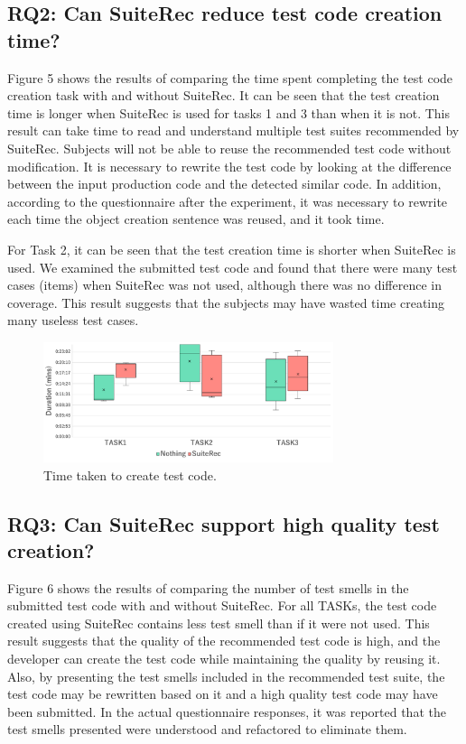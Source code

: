 \documentclass[conference]{IEEEtran}
\begin{document}
\subsection{RQ2: Can SuiteRec reduce test code creation time?}
Figure 5 shows the results of comparing the time spent completing the test code creation task with and without SuiteRec. It can be seen that the test creation time is longer when SuiteRec is used for tasks 1 and 3 than when it is not. This result can take time to read and understand multiple test suites recommended by SuiteRec. Subjects will not be able to reuse the recommended test code without modification. It is necessary to rewrite the test code by looking at the difference between the input production code and the detected similar code. In addition, according to the questionnaire after the experiment, it was necessary to rewrite each time the object creation sentence was reused, and it took time.

For Task 2, it can be seen that the test creation time is shorter when SuiteRec is used. We examined the submitted test code and found that there were many test cases (items) when SuiteRec was not used, although there was no difference in coverage. This result suggests that the subjects may have wasted time creating many useless test cases.

\begin{figure}[htbp]
\centerline{\includegraphics[width=8.5cm]{duration.pdf}}
\caption{Time taken to create test code.}
\label{fig}
\end{figure}

\subsection{RQ3: Can SuiteRec support high quality test creation?}
Figure 6 shows the results of comparing the number of test smells in the submitted test code with and without SuiteRec. For all TASKs, the test code created using SuiteRec contains less test smell than if it were not used. This result suggests that the quality of the recommended test code is high, and the developer can create the test code while maintaining the quality by reusing it. Also, by presenting the test smells included in the recommended test suite, the test code may be rewritten based on it and a high quality test code may have been submitted. In the actual questionnaire responses, it was reported that the test smells presented were understood and refactored to eliminate them.
\end{document}

